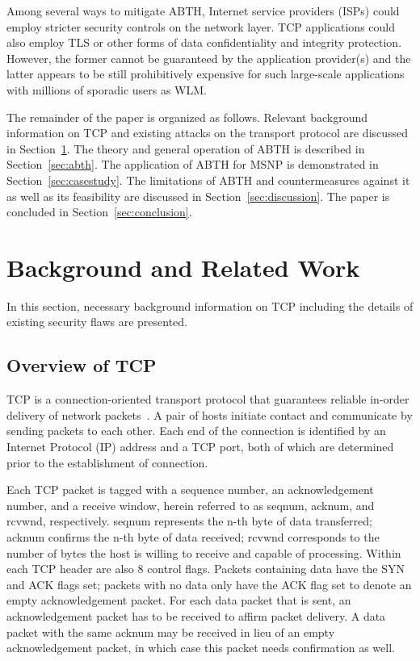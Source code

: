 \documentclass{sig-alternate}
\begin{document}
Among several ways to mitigate ABTH, Internet service providers (ISPs) could employ stricter security controls on the network layer.
TCP applications could also employ TLS or other forms of data confidentiality and integrity protection.
However, the former cannot be guaranteed by the application provider(s) and the latter appears to be still prohibitively expensive for such large-scale applications with millions of sporadic users as WLM.

The remainder of the paper is organized as follows.
Relevant background information on TCP and existing attacks on the transport protocol are discussed in Section~\ref{sec:background}.
The theory and general operation of ABTH is described in Section~\ref{sec:abth}.
The application of ABTH for MSNP is demonstrated in Section~\ref{sec:casestudy}.
The limitations of ABTH and countermeasures against it as well as its feasibility are discussed in Section~\ref{sec:discussion}.
The paper is concluded in Section~\ref{sec:conclusion}.

\section{Background and Related Work}
\label{sec:background}

In this section, necessary background information on TCP including the details of existing security flaws are presented.

\subsection{Overview of TCP}

TCP is a connection-oriented transport protocol that guarantees reliable in-order delivery of network packets~\cite{rfc:tcp}.
A pair of hosts initiate contact and communicate by sending packets to each other.
Each end of the connection is identified by an Internet Protocol (IP) address and a TCP port, both of which are determined prior to the establishment of connection.

Each TCP packet is tagged with a sequence number, an acknowledgement number, and a receive window, herein referred to as seqnum, acknum, and rcvwnd, respectively.
seqnum represents the n-th byte of data transferred; acknum confirms the n-th byte of data received; rcvwnd corresponds to the number of bytes the host is willing to receive and capable of processing.
Within each TCP header are also 8 control flags.
Packets containing data have the SYN and ACK flags set; packets with no data only have the ACK flag set to denote an empty acknowledgement packet.
For each data packet that is sent, an acknowledgement packet has to be received to affirm packet delivery.
A data packet with the same acknum may be received in lieu of an empty acknowledgement packet, in which case this packet needs confirmation as well.
\end{document}
